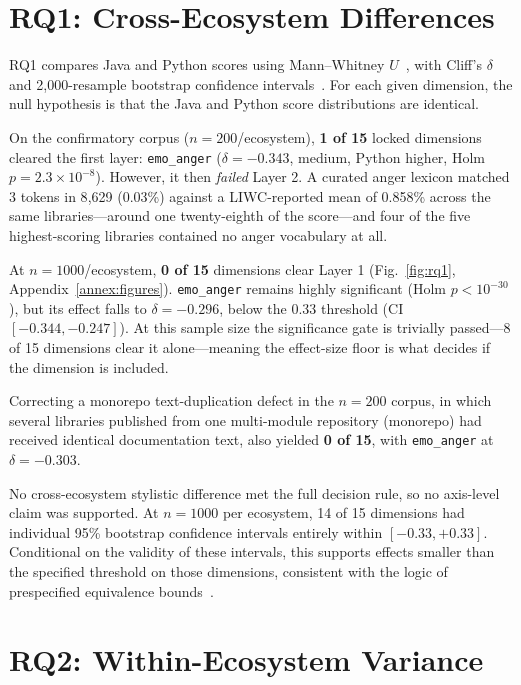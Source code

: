 \documentclass[conference]{IEEEtran}
\begin{document}
\section{RQ1: Cross-Ecosystem Differences}
\label{sec:results}

RQ1 compares Java and Python scores using Mann--Whitney $U$~\cite{mann1947}, with Cliff's $\delta$ and 2{,}000-resample bootstrap confidence intervals~\cite{efron1993}. For each given dimension, the null hypothesis is that the Java and Python score distributions are identical.

On the confirmatory corpus ($n=200$/ecosystem), \textbf{1 of 15} locked dimensions cleared the first layer: \texttt{emo\_anger} ($\delta = -0.343$, medium, Python higher, Holm $p = 2.3\times10^{-8}$). However, it then \emph{failed} Layer 2. A curated anger lexicon matched 3 tokens in 8{,}629 (0.03\%) against a LIWC-reported mean of 0.858\% across the same libraries---around one twenty-eighth of the score---and four of the five highest-scoring libraries contained no anger vocabulary at all. 

At $n=1000$/ecosystem, \textbf{0 of 15} dimensions clear Layer 1 (Fig.~\ref{fig:rq1}, Appendix~\ref{annex:figures}). \texttt{emo\_anger} remains highly significant (Holm $p < 10^{-30}$), but its effect falls to $\delta = -0.296$, below the 0.33 threshold (CI $[-0.344, -0.247]$). At this sample size the significance gate is trivially passed---8 of 15
dimensions clear it alone---meaning the effect-size floor is what decides if the dimension is included.

Correcting a monorepo text-duplication defect in the $n=200$ corpus, in which several libraries published from one multi-module repository (monorepo) had received
identical documentation text, also yielded \textbf{0 of 15}, with \texttt{emo\_anger} at $\delta = -0.303$.

No cross-ecosystem stylistic difference met the full decision rule, so no axis-level claim was supported. At $n=1000$ per ecosystem, 14 of 15 dimensions had individual 95\% bootstrap confidence intervals entirely within $[-0.33,+0.33]$. Conditional on the validity of these intervals, this supports effects smaller than the specified threshold on those dimensions, consistent with the logic of prespecified equivalence bounds~\cite{lakens2017}.

\section{RQ2: Within-Ecosystem Variance}
\label{sec:rq2}
\end{document}
